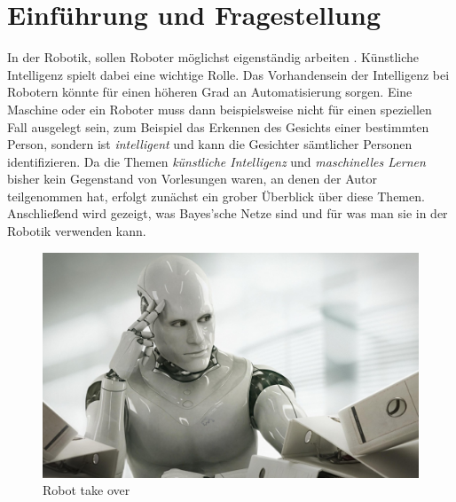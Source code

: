 \chapter{Einführung und Fragestellung}
In der Robotik, sollen Roboter möglichst eigenständig arbeiten . Künstliche Intelligenz spielt dabei eine wichtige Rolle. Das Vorhandensein der Intelligenz bei Robotern könnte für einen höheren Grad an Automatisierung sorgen. Eine Maschine oder ein Roboter muss dann beispielsweise nicht für einen speziellen Fall ausgelegt sein, zum Beispiel das Erkennen des Gesichts einer bestimmten Person, sondern ist \textit{intelligent} und kann die Gesichter sämtlicher Personen identifizieren. 
Da die Themen \textit{künstliche Intelligenz} und \textit{maschinelles Lernen} bisher kein Gegenstand von Vorlesungen waren, an denen der Autor teilgenommen hat, erfolgt zunächst ein grober Überblick über diese Themen.
Anschließend wird gezeigt, was Bayes'sche Netze sind und für was man sie in der Robotik verwenden kann.\begin{figure}%
\includegraphics[scale=0.15]{bilder/RobotTakeOverBS} 
\caption{Robot take over \cite{venturesafrica}}
\label{Entdeckungswahrscheinlichkeit}
\end{figure}
